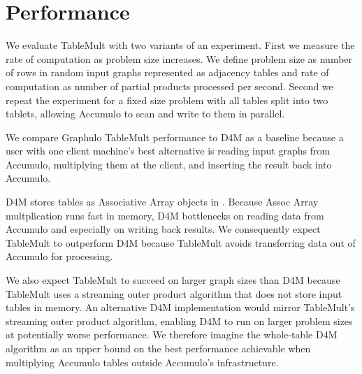
\section{Performance}
\label{sPerformance}

We evaluate TableMult with two variants of an experiment. 
First we measure the rate of computation as problem size increases.
We define problem size as number of rows in random input graphs 
represented as adjacency tables
and rate of computation as number of partial products processed per second.
Second we repeat the experiment for a fixed size problem with all tables split into two tablets,
allowing Accumulo to scan and write to them in parallel.



We compare Graphulo TableMult performance to D4M as a baseline because 
a user with one client machine's best alternative is reading input graphs from Accumulo, 
multiplying them at the client, and inserting the result back into Accumulo.

D4M stores tables as Associative Array objects in \matlab{}.  
Because Assoc Array multplication runs fast in memory, 
D4M bottlenecks on reading data from Accumulo and especially on writing back results.
We consequently expect TableMult to outperform D4M 
because TableMult avoids transferring data out of Accumulo for processing. 

We also expect TableMult to succeed on larger graph sizes than D4M because TableMult
uses a streaming outer product algorithm that does not store input tables in memory.
An alternative D4M implementation would mirror TableMult's streaming outer product algorithm,
enabling D4M to run on larger problem sizes at potentially worse performance.
We therefore imagine the whole-table D4M algorithm as an upper bound on the best performance 
achievable when multiplying Accumulo tables outside Accumulo's infrastructure.

